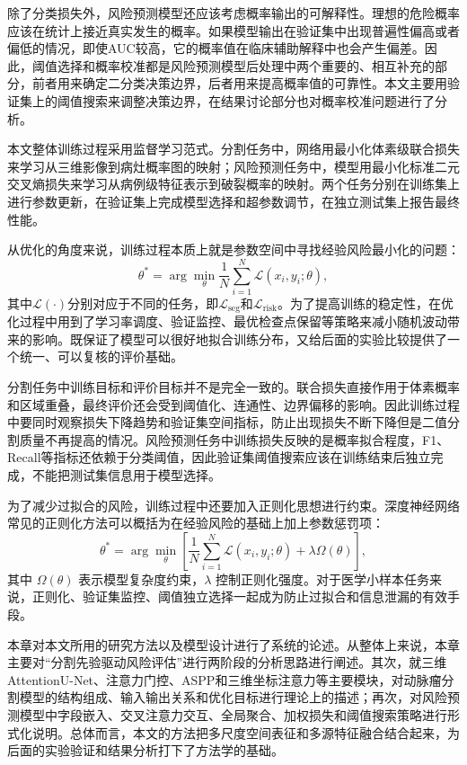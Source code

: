 除了分类损失外，风险预测模型还应该考虑概率输出的可解释性。理想的危险概率应该在统计上接近真实发生的概率。如果模型输出在验证集中出现普遍性偏高或者偏低的情况，即使AUC较高，它的概率值在临床辅助解释中也会产生偏差。因此，阈值选择和概率校准都是风险预测模型后处理中两个重要的、相互补充的部分，前者用来确定二分类决策边界，后者用来提高概率值的可靠性。本文主要用验证集上的阈值搜索来调整决策边界，在结果讨论部分也对概率校准问题进行了分析。


本文整体训练过程采用监督学习范式。分割任务中，网络用最小化体素级联合损失来学习从三维影像到病灶概率图的映射；风险预测任务中，模型用最小化标准二元交叉熵损失来学习从病例级特征表示到破裂概率的映射。两个任务分别在训练集上进行参数更新，在验证集上完成模型选择和超参数调节，在独立测试集上报告最终性能。

从优化的角度来说，训练过程本质上就是参数空间中寻找经验风险最小化的问题：
\begin{equation}
\theta^{\ast}=\arg\min_{\theta}\frac{1}{N}\sum_{i=1}^{N}\mathcal{L}(x_i,y_i;\theta),
\end{equation}
其中$\mathcal{L}(\cdot)$分别对应于不同的任务，即$\mathcal{L}_{\mathrm{seg}}$和$\mathcal{L}_{\mathrm{risk}}$。为了提高训练的稳定性，在优化过程中用到了学习率调度、验证监控、最优检查点保留等策略来减小随机波动带来的影响。既保证了模型可以很好地拟合训练分布，又给后面的实验比较提供了一个统一、可以复核的评价基础。

分割任务中训练目标和评价目标并不是完全一致的。联合损失直接作用于体素概率和区域重叠，最终评价还会受到阈值化、连通性、边界偏移的影响。因此训练过程中要同时观察损失下降趋势和验证集空间指标，防止出现损失不断下降但是二值分割质量不再提高的情况。风险预测任务中训练损失反映的是概率拟合程度，F1、Recall等指标还依赖于分类阈值，因此验证集阈值搜索应该在训练结束后独立完成，不能把测试集信息用于模型选择。

为了减少过拟合的风险，训练过程中还要加入正则化思想进行约束。深度神经网络常见的正则化方法可以概括为在经验风险的基础上加上参数惩罚项：
\begin{equation}
\theta^{\ast}=\arg\min_{\theta}\left[\frac{1}{N}\sum_{i=1}^{N}\mathcal{L}(x_i,y_i;\theta)+\lambda\Omega(\theta)\right],
\label{eq:regularized-obj}
\end{equation}
其中 $\Omega(\theta)$ 表示模型复杂度约束，$\lambda$ 控制正则化强度。对于医学小样本任务来说，正则化、验证集监控、阈值独立选择一起成为防止过拟合和信息泄漏的有效手段。

本章对本文所用的研究方法以及模型设计进行了系统的论述。从整体上来说，本章主要对“分割先验驱动风险评估”进行两阶段的分析思路进行阐述。其次，就三维AttentionU-Net、注意力门控、ASPP和三维坐标注意力等主要模块，对动脉瘤分割模型的结构组成、输入输出关系和优化目标进行理论上的描述；再次，对风险预测模型中字段嵌入、交叉注意力交互、全局聚合、加权损失和阈值搜索策略进行形式化说明。总体而言，本文的方法把多尺度空间表征和多源特征融合结合起来，为后面的实验验证和结果分析打下了方法学的基础。